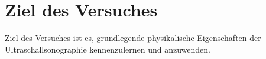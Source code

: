 \section{Ziel des Versuches}
\label{sec:versuchsziel}

Ziel des Versuches ist es, grundlegende physikalische
Eigenschaften der Ultraschallsonographie kennenzulernen und
anzuwenden.